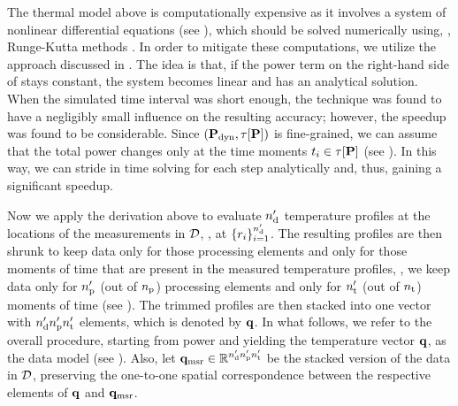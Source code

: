 



The thermal model above is computationally expensive as it involves a system of nonlinear differential equations (see ), which should be solved numerically using, \eg, Runge-Kutta methods \cite{press2007}. In order to mitigate these computations, we utilize the approach discussed in \cite{ukhov2012}.
The idea is that, if the power term on the right-hand side of  stays constant, the system becomes linear and has an analytical solution. When the simulated time interval was short enough, the technique was found to have a negligibly small influence on the resulting accuracy; however, the speedup was found to be considerable.
Since $(\mathbf{P}_{\text{dyn}}, \tau[\mathbf{P}])$ is fine-grained, we can assume that the total power changes only at the time moments $t_i \in \tau[\mathbf{P}]$ (see ). In this way, we can stride in time solving  for each step analytically and, thus, gaining a significant speedup.

Now we apply the derivation above to evaluate ${n_\text{d}'}$ temperature profiles at the locations of the measurements in $\mathcal{D}$, \ie, at $\{ r_i \}_{i = 1}^{n_\text{d}'}$.
The resulting profiles are then shrunk to keep data only for those processing elements and only for those moments of time that are present in the measured temperature profiles, \ie, we keep data only for ${n_\text{p}'}$ (out of ${n_\text{p}}$) processing elements and only for ${n_\text{t}'}$ (out of ${n_\text{t}}$) moments of time (see ).
The trimmed profiles are then stacked into one vector with ${n_\text{d}'} {n_\text{p}'} {n_\text{t}'}$ elements, which is denoted by $\mathbf{q}$.
In what follows, we refer to the overall procedure, starting from power and yielding the temperature vector $\mathbf{q}$, as the data model (see ).
Also, let $\mathbf{q}_{\text{msr}} \in \mathbb{R}^{{n_\text{d}'} {n_\text{p}'} {n_\text{t}'}}$ be the stacked version of the data in $\mathcal{D}$, preserving the one-to-one spatial correspondence between the respective elements of $\mathbf{q}$ and $\mathbf{q}_{\text{msr}}$.
